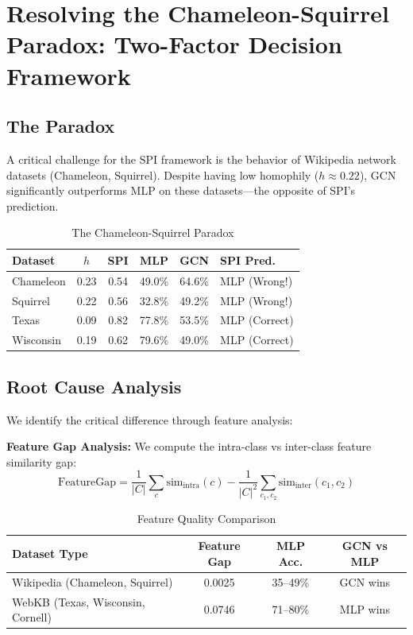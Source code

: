 \section{Resolving the Chameleon-Squirrel Paradox: Two-Factor Decision Framework}
\label{sec:two_factor}

\subsection{The Paradox}

A critical challenge for the SPI framework is the behavior of Wikipedia network datasets (Chameleon, Squirrel). Despite having low homophily ($h \approx 0.22$), GCN significantly outperforms MLP on these datasets---the opposite of SPI's prediction.

\begin{table}[h]
\centering
\caption{The Chameleon-Squirrel Paradox}
\label{tab:paradox}
\small
\begin{tabular}{@{}lccccl@{}}
\toprule
\textbf{Dataset} & \textbf{$h$} & \textbf{SPI} & \textbf{MLP} & \textbf{GCN} & \textbf{SPI Pred.} \\
\midrule
Chameleon & 0.23 & 0.54 & 49.0\% & 64.6\% & MLP (Wrong!) \\
Squirrel & 0.22 & 0.56 & 32.8\% & 49.2\% & MLP (Wrong!) \\
\midrule
Texas & 0.09 & 0.82 & 77.8\% & 53.5\% & MLP (Correct) \\
Wisconsin & 0.19 & 0.62 & 79.6\% & 49.0\% & MLP (Correct) \\
\bottomrule
\end{tabular}
\end{table}

\subsection{Root Cause Analysis}

We identify the critical difference through feature analysis:

\textbf{Feature Gap Analysis:} We compute the intra-class vs inter-class feature similarity gap:
\begin{equation}
\text{FeatureGap} = \frac{1}{|C|}\sum_{c} \text{sim}_{\text{intra}}(c) - \frac{1}{|C|^2}\sum_{c_1,c_2} \text{sim}_{\text{inter}}(c_1, c_2)
\end{equation}

\begin{table}[h]
\centering
\caption{Feature Quality Comparison}
\label{tab:feature_quality}
\small
\begin{tabular}{@{}lccc@{}}
\toprule
\textbf{Dataset Type} & \textbf{Feature Gap} & \textbf{MLP Acc.} & \textbf{GCN vs MLP} \\
\midrule
Wikipedia (Chameleon, Squirrel) & 0.0025 & 35--49\% & GCN wins \\
WebKB (Texas, Wisconsin, Cornell) & 0.0746 & 71--80\% & MLP wins \\
\bottomrule
\end{tabular}
\end{table}

